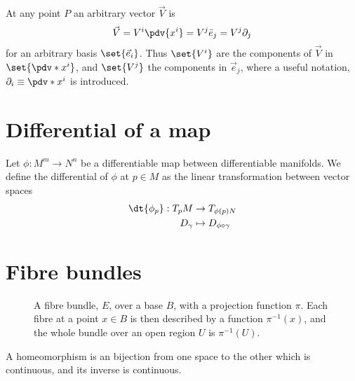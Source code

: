 At any point $P$ an arbitrary vector $\vec{V}$ is
\[ \vec{V} = V^i \pdv{x^i} = V^j \bar{e}_j = V^j \partial_j\] for an
arbitrary basis $\set{\vec{e}_i}$. Thus $\set{V^i}$ are the components
of $\vec{V}$ in $\set{ \pdv*{x^i}}$, and $\set{V^j}$ the components in
$\vec{e}_j$, where a useful notation, $\partial_i \equiv \pdv*{x^i}$ is
introduced.

\section{Differential of a map}
\label{sec:differential-map}

\begin{definition}[Differential]
  Let $\phi: M^m \to N^n$ be a differentiable map between
  differentiable manifolds. We define the differential of $\phi$ at $p
  \in M$ as the linear transformation between vector spaces
  \begin{align*}
    \dt{\phi_p} : T_pM & \to T_{\phi(p)N} \\
D_{\gamma} &\mapsto D_{\phi \circ \gamma}
  \end{align*}
\end{definition}

\section{Fibre bundles}
\label{sec:fiber-bundles}



\begin{figure}[b]
  \centering
  
  \caption{A fibre bundle, $E$, over a base $B$, with a projection
    function $\pi$. Each fibre at a point $x \in B$ is then described
    by a function $\pi^{-1}(x)$, and the whole bundle over an open
    region $U$ is  $\pi^{-1}(U)$.}
  \label{fig:fibre-bundle}
\end{figure}

\begin{definition}[Homeomorphism]
A homeomorphism is an bijection from one space to the other which is
continuous, and its inverse is continuous.
\end{definition}


